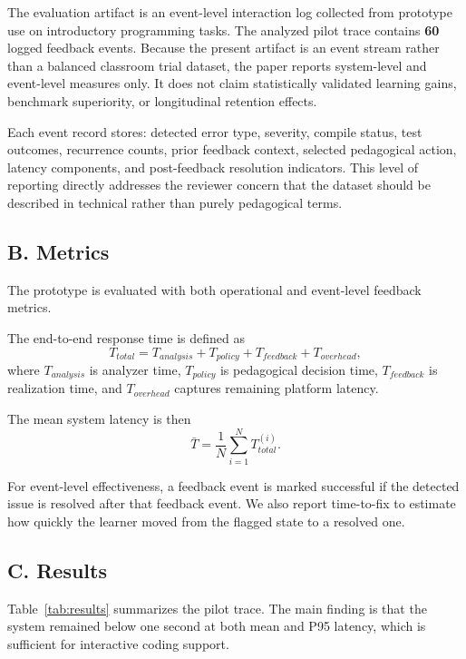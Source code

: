 ﻿\documentclass[conference]{IEEEtran}
\begin{document}
The evaluation artifact is an event-level interaction log collected from prototype use on introductory programming tasks. The analyzed pilot trace contains \textbf{60} logged feedback events. Because the present artifact is an event stream rather than a balanced classroom trial dataset, the paper reports system-level and event-level measures only. It does not claim statistically validated learning gains, benchmark superiority, or longitudinal retention effects.

Each event record stores: detected error type, severity, compile status, test outcomes, recurrence counts, prior feedback context, selected pedagogical action, latency components, and post-feedback resolution indicators. This level of reporting directly addresses the reviewer concern that the dataset should be described in technical rather than purely pedagogical terms.

\subsection*{B. Metrics}

The prototype is evaluated with both operational and event-level feedback metrics.

The end-to-end response time is defined as
\[
T_{total} = T_{analysis} + T_{policy} + T_{feedback} + T_{overhead},
\]
where $T_{analysis}$ is analyzer time, $T_{policy}$ is pedagogical decision time, $T_{feedback}$ is realization time, and $T_{overhead}$ captures remaining platform latency.

The mean system latency is then
\[
\bar{T}=\frac{1}{N}\sum_{i=1}^{N} T_{total}^{(i)}.
\]

For event-level effectiveness, a feedback event is marked successful if the detected issue is resolved after that feedback event. We also report time-to-fix to estimate how quickly the learner moved from the flagged state to a resolved one.

\subsection*{C. Results}

Table~\ref{tab:results} summarizes the pilot trace. The main finding is that the system remained below one second at both mean and P95 latency, which is sufficient for interactive coding support.
\end{document}

